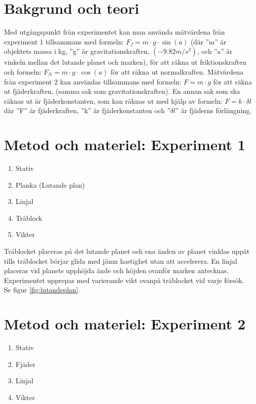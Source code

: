 \documentclass[11p, titlepage, oneside, a4paper]{article}
\begin{document}
	\section{Bakgrund och teori}
        Med utgångspunkt från experimentet kan man använda mätvärdena från experiment 1 tillsammans med formeln: $F_f = {m}\cdot{g}\cdot{\sin(a)}$ (där ''m'' är objektets massa i kg, ''g'' är gravitationskraften, $(-9.82m/s^{2})$, och ''a'' är vinkeln mellan det lutande planet och marken), för att räkna ut friktionskraften och formeln: $F_N = {m}\cdot{g}\cdot{\cos(a)}$ för att räkna ut normalkraften. Mätvärdena från experiment 2 kan användas tillsammans med formeln: $F = {m}\cdot{g}$ för att räkna ut fjäderkraften, (samma sak som gravitationskraften). En annan sak som ska räknas ut är fjäderkonstanten, som kan räknas ut med hjälp av formeln: $F = {k}\cdot{\delta l}$ där ''F'' är fjäderkraften, ''k'' är fjäderkonstanten och ''$\delta l$'' är fjäderns förlängning. \parencite{impuls}
	

	\section{Metod och materiel: Experiment 1}
        \begin{enumerate}
            \item Stativ
            \item Planka (Lutande plan)
            \item Linjal
            \item Träblock
            \item Vikter
        \end{enumerate}

 Träblocket placeras på det lutande planet och ena änden av planet vinklas uppåt tills träblocket börjar glida med jämn hastighet utan att accelerera. En linjal placeras vid planets upphöjda ände och höjden ovanför marken antecknas. Experimentet upprepas med varierande vikt ovanpå träblocket vid varje försök. Se figur \ref{fig:lutandeplan}.

	\section{Metod och materiel: Experiment 2}
        \begin{enumerate}
            \item Stativ
            \item Fjäder
            \item Linjal
            \item Vikter
        \end{enumerate}
\end{document}
